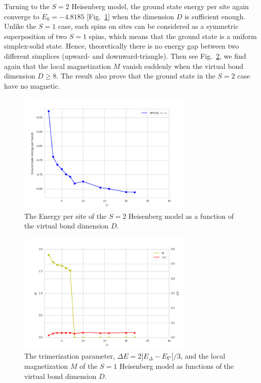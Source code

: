 Turning to the $S=2$ Heisenberg model, the ground state energy per site again converge to $E_0 = -4.8185$ [Fig.~\ref{fig4330}] when the dimension $D$ is sufficient enough. Unlike the $S=1$ case, each spins on sites can be considered as a symmetric superposition of two $S=1$ spins, which means that the ground state is a uniform simplex-solid state. Hence, theoretically there is no energy gap between two different simplices (upward- and downward-triangle). Then see Fig.~\ref{fig4331}, we find again that the local magnetization $M$ vanish suddenly when the virtual bond dimension $D \geq 8$. The result also prove that the ground state in the $S=2$ case have no magnetic.

\begin{figure}[H]
	\centering
	\includegraphics[width=0.75\textwidth]{figures/3pess_S2GE.png}
	\caption[The Energy per site of the $S=2$ Heisenberg model as a function of the virtual bond dimension $D$]{The Energy per site of the $S=2$ Heisenberg model as a function of the virtual bond dimension $D$.}
	\label{fig4330}
\end{figure}

\begin{figure}[!ht]
	\centering
	\includegraphics[width=0.75\textwidth]{figures/3pess_S2M.png}
	\caption[The trimerization parameter, $\Delta E = 2 |E_{\Delta}-E_{\nabla}| / 3$, and the local magnetization $M$ of the $S=1$ Heisenberg model as functions of the virtual bond dimension $D$]{The trimerization parameter, $\Delta E = 2 |E_{\Delta}-E_{\nabla}| / 3$, and the local magnetization $M$ of the $S=1$ Heisenberg model as functions of the virtual bond dimension $D$.}
	\label{fig4331}
\end{figure}

